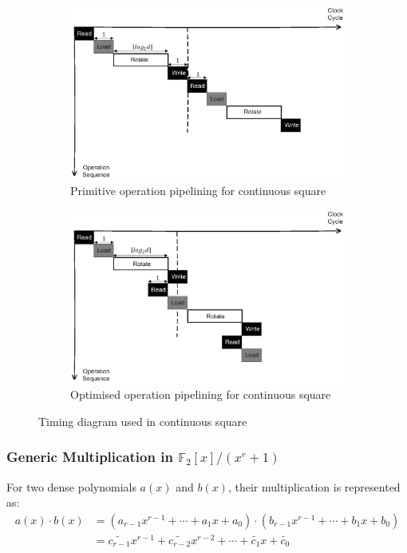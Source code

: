 \documentclass[preprint]{iacrtrans}
\begin{document}
\begin{figure}[!tb]
\centering
\begin{subfigure}[t]{0.45\textwidth}\centering
\includegraphics[width=\textwidth]{./fig/pipeline_square.eps}
\caption{Primitive operation pipelining for continuous square}
\label{fig:pipeline_squ}
\end{subfigure}
\hspace{1em}
\begin{subfigure}[t]{0.45\textwidth}\centering
\includegraphics[width=\textwidth]{./fig/pipeline_square2.eps}
\caption{Optimised operation pipelining for continuous square }
\label{fig:pipeline_squ2}
\end{subfigure}
\caption{Timing diagram used in continuous square}
\end{figure}


\subsubsection{Generic Multiplication in $\mathbb{F}_2[x]/(x^r+1)$}
For two dense polynomials $a(x)$ and $b(x)$, their multiplication is represented as:
\begin{align}
    a(x)\cdot b(x) &= (a_{r-1}x^{r-1}+\cdots + a_{1}x + a_0)\cdot(b_{r-1}x^{r-1}+\cdots + b_{1}x + b_0)\\
    &= \widetilde{c_{r-1}}x^{r-1}+\widetilde{c_{r-2}}x^{r-2}+\cdots + \widetilde{c_{1}}x +\widetilde{c_0}
\end{align}
\end{document}
